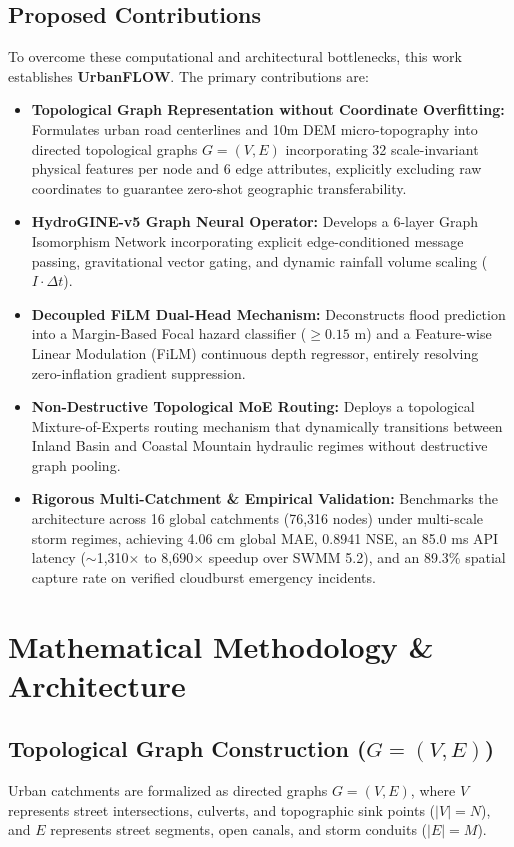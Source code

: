 \documentclass[conference]{IEEEtran}
\begin{document}
\subsection{Proposed Contributions}
To overcome these computational and architectural bottlenecks, this work establishes \textbf{UrbanFLOW}. The primary contributions are:
\begin{itemize}
    \item \textbf{Topological Graph Representation without Coordinate Overfitting:} Formulates urban road centerlines and 10m DEM micro-topography into directed topological graphs $G=(V, E)$ incorporating 32 scale-invariant physical features per node and 6 edge attributes, explicitly excluding raw coordinates to guarantee zero-shot geographic transferability.
    \item \textbf{HydroGINE-v5 Graph Neural Operator:} Develops a 6-layer Graph Isomorphism Network incorporating explicit edge-conditioned message passing, gravitational vector gating, and dynamic rainfall volume scaling ($I \cdot \Delta t$).
    \item \textbf{Decoupled FiLM Dual-Head Mechanism:} Deconstructs flood prediction into a Margin-Based Focal hazard classifier ($\ge 0.15\text{ m}$) and a Feature-wise Linear Modulation (FiLM) continuous depth regressor, entirely resolving zero-inflation gradient suppression.
    \item \textbf{Non-Destructive Topological MoE Routing:} Deploys a topological Mixture-of-Experts routing mechanism that dynamically transitions between Inland Basin and Coastal Mountain hydraulic regimes without destructive graph pooling.
    \item \textbf{Rigorous Multi-Catchment \& Empirical Validation:} Benchmarks the architecture across 16 global catchments (76,316 nodes) under multi-scale storm regimes, achieving 4.06 cm global MAE, 0.8941 NSE, an 85.0 ms API latency ($\sim$1,310$\times$ to 8,690$\times$ speedup over SWMM 5.2), and an 89.3\% spatial capture rate on verified cloudburst emergency incidents.
\end{itemize}

\section{Mathematical Methodology \& Architecture}

\subsection{Topological Graph Construction ($G = (V, E)$)}
Urban catchments are formalized as directed graphs $G = (V, E)$, where $V$ represents street intersections, culverts, and topographic sink points ($|V| = N$), and $E$ represents street segments, open canals, and storm conduits ($|E| = M$).
\end{document}
